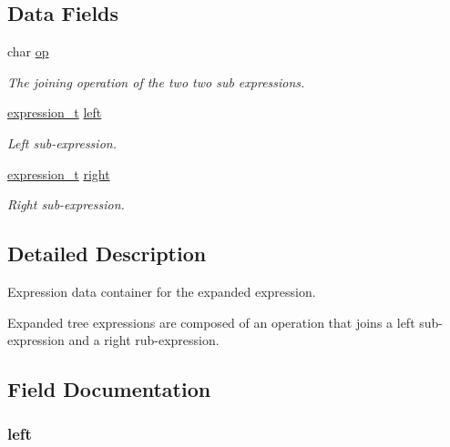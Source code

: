 \subsection*{Data Fields}
\begin{DoxyCompactItemize}
\item 
char \hyperlink{structexpression__data__tree_a3d5c605540ca9e9431799d5a79cb94b0}{op}
\begin{DoxyCompactList}\small\item\em The joining operation of the two two sub expressions. \end{DoxyCompactList}\item 
\hyperlink{expression__lite_8h_ac198bce62637e5d742da0218d544a7ac}{expression\+\_\+t} \hyperlink{structexpression__data__tree_a46f4a906ae330c3598e899fc77c3d17a}{left}
\begin{DoxyCompactList}\small\item\em Left sub-\/expression. \end{DoxyCompactList}\item 
\hyperlink{expression__lite_8h_ac198bce62637e5d742da0218d544a7ac}{expression\+\_\+t} \hyperlink{structexpression__data__tree_ad77c9db9f894879970e67e6cb081db60}{right}
\begin{DoxyCompactList}\small\item\em Right sub-\/expression. \end{DoxyCompactList}\end{DoxyCompactItemize}


\subsection{Detailed Description}
Expression data container for the expanded expression. 

Expanded tree expressions are composed of an operation that joins a left sub-\/expression and a right rub-\/expression. 

\subsection{Field Documentation}
\hypertarget{structexpression__data__tree_a46f4a906ae330c3598e899fc77c3d17a}{
\subsubsection[{left}]{ left}}\label{structexpression__data__tree_a46f4a906ae330c3598e899fc77c3d17a}


